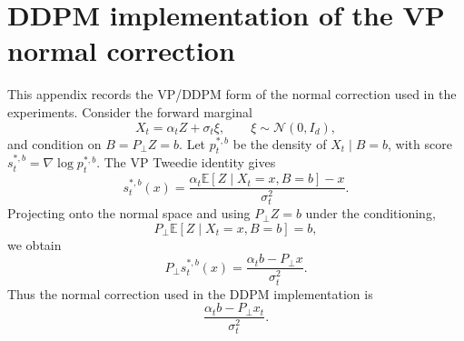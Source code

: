 \documentclass[twoside,11pt]{article}
\newcommand{\E}{\mathbb{E}}
\numberwithin{equation}{section}
\begin{document}

\section{DDPM implementation of the VP normal correction}
\label{app:vp-ddpm-normal-correction}

This appendix records the VP/DDPM form of the normal correction used in the
experiments. Consider the forward marginal
\[
X_t=\alpha_t Z+\sigma_t\xi,
\qquad
\xi\sim\mathcal N(0,I_d),
\]
and condition on \(B=P_\perp Z=b\). Let \(p_t^{*,b}\) be the density of
\(X_t\mid B=b\), with score \(s_t^{*,b}=\nabla\log p_t^{*,b}\). The VP Tweedie
identity gives
\[
s_t^{*,b}(x)
=
\frac{\alpha_t\E[Z\mid X_t=x,B=b]-x}{\sigma_t^2}.
\]
Projecting onto the normal space and using \(P_\perp Z=b\) under the
conditioning,
\[
P_\perp\E[Z\mid X_t=x,B=b]=b,
\]
we obtain
\[
P_\perp s_t^{*,b}(x)
=
\frac{\alpha_t b-P_\perp x}{\sigma_t^2}.
\]
Thus the normal correction used in the DDPM implementation is
\[
\frac{\alpha_t b-P_\perp x_t}{\sigma_t^2}.
\]
\end{document}
